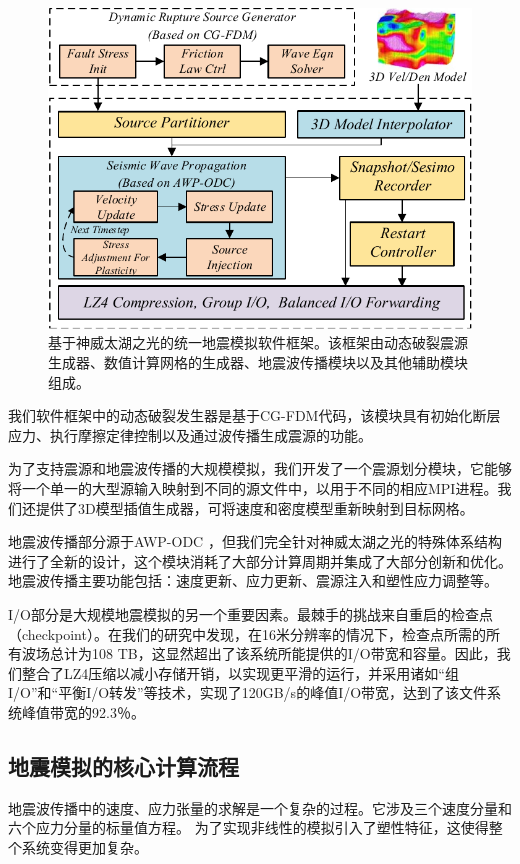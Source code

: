 \documentclass[degree=doctor]{thuthesis}
\begin{document}
\begin{figure}[h]
\centering
\includegraphics[width=0.9\columnwidth]{architecture.pdf}
\caption{基于神威太湖之光的统一地震模拟软件框架。该框架由动态破裂震源生成器、数值计算网格的生成器、地震波传播模块以及其他辅助模块组成。}
\label{fig:framework}
\end{figure}

我们软件框架中的动态破裂发生器是基于CG-FDM代码\citep{zhang2014three}，该模块具有初始化断层应力、执行摩擦定律控制以及通过波传播生成震源的功能。

为了支持震源和地震波传播的大规模模拟，我们开发了一个震源划分模块，它能够将一个单一的大型源输入映射到不同的源文件中，以用于不同的相应MPI进程。我们还提供了3D模型插值生成器，可将速度和密度模型重新映射到目标网格。

地震波传播部分源于AWP-ODC \citep {cui2010scalable}，但我们完全针对神威太湖之光的特殊体系结构进行了全新的设计，这个模块消耗了大部分计算周期并集成了大部分创新和优化。地震波传播主要功能包括：速度更新、应力更新、震源注入和塑性应力调整等。

I/O部分是大规模地震模拟的另一个重要因素。最棘手的挑战来自重启的检查点（checkpoint）。在我们的研究中发现，在16米分辨率的情况下，检查点所需的所有波场总计为108 TB，这显然超出了该系统所能提供的I/O带宽和容量。因此，我们整合了LZ4压缩以减小存储开销，以实现更平滑的运行，并采用诸如“组I/O”和“平衡I/O转发”等技术，实现了120GB/s的峰值I/O带宽，达到了该文件系统峰值带宽的92.3％。

\subsection{地震模拟的核心计算流程}

地震波传播中的速度、应力张量的求解是一个复杂的过程。它涉及三个速度分量和六个应力分量的标量值方程。 为了实现非线性的模拟引入了塑性特征，这使得整个系统变得更加复杂。
\end{document}

